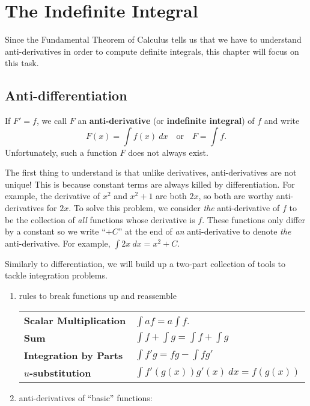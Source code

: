 \section{The Indefinite Integral}

Since the Fundamental Theorem of Calculus tells us that we have to understand anti-derivatives in order to compute definite integrals, this chapter will focus on this task.


\subsection{Anti-differentiation}


If $F'=f$, we call $F$ an \textbf{anti-derivative} (or \textbf{indefinite integral}) of $f$ and write
$$F(x)=\int f(x)\ dx \quad\text{or}\quad F=\int f.$$ 
Unfortunately, such a function $F$ does not always exist. 



The first thing to understand is that unlike derivatives, anti-derivatives are not unique! This is because constant terms are always killed by differentiation. For example, the derivative of $x^2$ and $x^2+1$ are both $2x$, so both are worthy anti-derivatives for $2x$. To solve this problem, we consider \textit{the} anti-derivative of $f$ to be the collection of \textit{all} functions whose derivative is $f$. These functions only differ by a constant so we write ``$+C$'' at the end of \textit{an} anti-derivative to denote \textit{the} anti-derivative. For example, $\int 2x\ dx = x^2+C$.

Similarly to differentiation, we will build up a two-part collection of tools to tackle integration problems.

\begin{enumerate}
\item rules to break functions up and reassemble

\begin{center}
\def\arraystretch{1.5}
\begin{tabular}{@{}ll@{}}
\toprule[0.4mm]
\textbf{Scalar Multiplication} & $\int a f = a \int f$. \\
\textbf{Sum} & $\int f + \int g= \int f + \int g$ \\
\textbf{Integration by Parts} & $\int f'g = fg - \int fg' $ \\
\textbf{$u$-substitution} & $\int f'(g(x))g'(x)\ dx =  f(g(x))$ \\
\bottomrule[0.4mm]
\end{tabular}
\end{center}

\item anti-derivatives of ``basic'' functions:

\end{enumerate}


